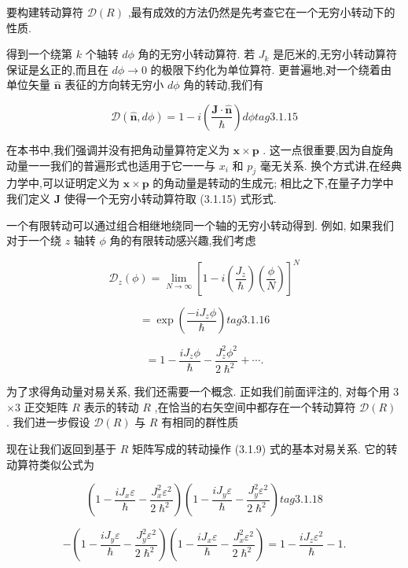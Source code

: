 要构建转动算符 $\mathcal{D}\left( R\right)$ ,最有成效的方法仍然是先考查它在一个无穷小转动下的性质. 

得到一个绕第 $k$ 个轴转 ${d\phi }$ 角的无穷小转动算符. 若 ${J}_{k}$ 是厄米的,无穷小转动算符保证是幺正的,而且在 ${d\phi } \rightarrow 0$ 的极限下约化为单位算符. 更普遍地,对一个绕着由单位矢量 $\widehat{\mathbf{n}}$ 表征的方向转无穷小 ${d\phi }$ 角的转动,我们有

$$
\mathcal{D}\left( {\widehat{\mathbf{n}},{d\phi }}\right) = 1 - i\left( \frac{\mathbf{J} \cdot \widehat{\mathbf{n}}}{\hslash }\right) {d\phi } tag{3.1.15}
$$

在本书中,我们强调并没有把角动量算符定义为 $\mathbf{x} \times \mathbf{p}$ . 这一点很重要,因为自旋角动量一一我们的普遍形式也适用于它一一与 ${x}_{i}$ 和 ${p}_{j}$ 毫无关系. 换个方式讲,在经典力学中,可以证明定义为 $\mathbf{x} \times \mathbf{p}$ 的角动量是转动的生成元; 相比之下,在量子力学中我们定义 $\mathbf{J}$ 使得一个无穷小转动算符取 (3.1.15) 式形式.

一个有限转动可以通过组合相继地绕同一个轴的无穷小转动得到. 例如, 如果我们对于一个绕 $z$ 轴转 $\phi$ 角的有限转动感兴趣,我们考虑

$$
{\mathcal{D}}_{z}\left( \phi \right) = \mathop{\lim }\limits_{{N \rightarrow \infty }}{\left\lbrack 1 - i\left( \frac{{J}_{z}}{\hslash }\right) \left( \frac{\phi }{N}\right) \right\rbrack }^{N}
$$

$$
= \exp \left( \frac{-i{J}_{z}\phi }{\hslash }\right) tag{3. 1.16}
$$

$$
= 1 - \frac{i{J}_{z}\phi }{\hslash } - \frac{{J}_{z}^{2}{\phi }^{2}}{2{\hslash }^{2}} + \cdots .
$$

为了求得角动量对易关系, 我们还需要一个概念. 正如我们前面评注的, 对每个用 3 $\times 3$ 正交矩阵 $R$ 表示的转动 $R$ ,在恰当的右矢空间中都存在一个转动算符 $\mathcal{D}\left( R\right)$ . 我们进一步假设 $\mathcal{D}\left( R\right)$ 与 $R$ 有相同的群性质


现在让我们返回到基于 $R$ 矩阵写成的转动操作 (3.1.9) 式的基本对易关系. 它的转动算符类似公式为

$$
\left( {1 - \frac{i{J}_{x}\varepsilon }{\hslash } - \frac{{J}_{x}^{2}{\varepsilon }^{2}}{2{\hslash }^{2}}}\right) \left( {1 - \frac{i{J}_{y}\varepsilon }{\hslash } - \frac{{J}_{y}^{2}{\varepsilon }^{2}}{2{\hslash }^{2}}}\right) tag{3. 1.18}
$$

$$
- \left( {1 - \frac{i{J}_{y}\varepsilon }{\hslash } - \frac{{J}_{y}^{2}{\varepsilon }^{2}}{2{\hslash }^{2}}}\right) \left( {1 - \frac{i{J}_{x}\varepsilon }{\hslash } - \frac{{J}_{x}^{2}{\varepsilon }^{2}}{2{\hslash }^{2}}}\right) = 1 - \frac{i{J}_{z}{\varepsilon }^{2}}{\hslash } - 1.
$$

